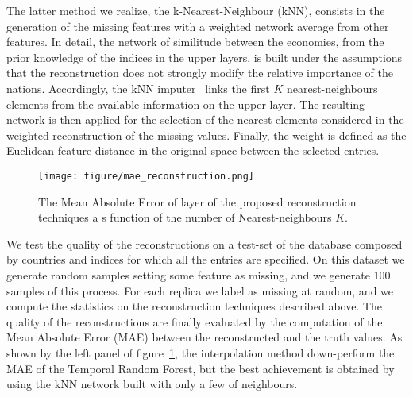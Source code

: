 \documentclass[fleqn,10pt]{article}
\begin{document}
The latter method we realize, the k-Nearest-Neighbour (kNN), consists in the generation of the missing features with a weighted network average from other features.
In detail, the network of similitude between the economies, from the prior knowledge of the indices in the upper layers, is built under the assumptions that the reconstruction does not strongly modify the relative importance of the nations.
Accordingly, the kNN imputer~\cite{Troyanskaya2001} links the first $K$ nearest-neighbours elements from the available information on the upper layer.
The resulting network is then applied for the selection of the nearest elements considered in the weighted reconstruction of the missing values.
Finally, the weight is defined as the Euclidean feature-distance in the original space between the selected entries.

\begin{figure}[!h]
	\centering
	\texttt{[image: figure/mae\_reconstruction.png]}	
	\caption{The Mean Absolute Error of layer of the proposed reconstruction techniques a s function of the number of Nearest-neighbours $K$. }
	\label{fig:mae}
\end{figure}
We test the quality of the reconstructions on a test-set of the database composed by countries and indices for which all the entries are specified.
On this dataset we generate random samples setting some feature as missing, and we generate 100 samples of this process.
For each replica we label as missing at random, and we compute the statistics on the reconstruction techniques described above.
The quality of the reconstructions are finally evaluated by the computation of the Mean Absolute Error (MAE) between the reconstructed and the truth values.
As shown by the left panel of figure~\ref{fig:mae}, the interpolation method down-perform the MAE of the Temporal Random Forest, 
but the best achievement is obtained by using the kNN network built with only a few of neighbours.
\end{document}
